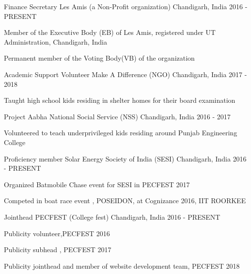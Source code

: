 \begin{cventries}
  \cventry
    {Finance Secretary}
    {Les Amis (a Non-Profit organization)}
    {Chandigarh, India}
    {2016 - PRESENT}
    {
      \begin{cvitems}
        \item {Member of the Executive Body (EB) of Les Amis, registered under UT Administration, Chandigarh, India}
        \item {Permanent member of the Voting Body(VB) of the organization}
      \end{cvitems}
    }
  \cventry
    {Academic Support Volunteer}
    {Make A Difference (NGO)}
    {Chandigarh, India}
    {2017 - 2018}
    {
      \begin{cvitems}
        \item {Taught high school kids residing in shelter homes for their board examination}
      \end{cvitems}
    }
   \cventry
    {Project Aabha}
    {National Social Service (NSS)}
    {Chandigarh, India}
    {2016 - 2017}
    {
      \begin{cvitems}
        \item Volunteered to teach underprivileged kids residing around Punjab Engineering College
      \end{cvitems}
    }
    \cventry
    {Proficiency member}
    {Solar Energy Society of India (SESI)}
    {Chandigarh, India}
    {2016 - PRESENT}
    {
      \begin{cvitems}
        \item Organized Batmobile Chase event for SESI in PECFEST 2017
        \item Competed in boat race event , POSEIDON, at Cognizance 2016, IIT ROORKEE
      \end{cvitems}
    }
    \cventry
    {Jointhead}
    {PECFEST (College fest)}
    {Chandigarh, India}
    {2016 - PRESENT}
    {
      \begin{cvitems}
        \item Publicity volunteer,PECFEST 2016
        \item Publicity subhead , PECFEST 2017
        \item Publicity jointhead and member of website development team, PECFEST 2018
      \end{cvitems}
    }
   
\end{cventries}
